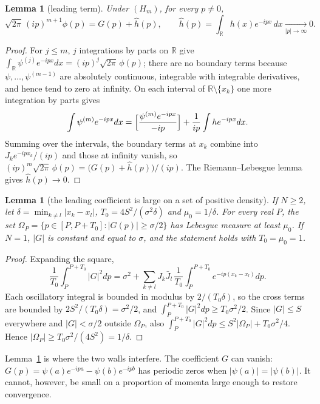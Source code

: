 \documentclass[11pt,a4paper]{article}
\newtheorem{lemma}[theorem]{Lemma}
\theoremstyle{definition}
\theoremstyle{plain}
\newcommand{\R}{\mathbb{R}}
\begin{document}
\begin{lemma}[leading term]\label{lem:A}
Under $(H_m)$, for every $p\neq0$,
\[
\sqrt{2\pi}\,(ip)^{m+1}\phi(p)=G(p)+\hat h(p),\qquad
\hat h(p)=\int_\R h(x)e^{-ipx}\,dx\xrightarrow[|p|\to\infty]{}0 .
\]
\end{lemma}

\begin{proof}
For $j\le m$, $j$ integrations by parts on $\R$ give
$\int_\R\psi^{(j)}e^{-ipx}dx=(ip)^j\sqrt{2\pi}\,\phi(p)$; there are no
boundary terms because $\psi,\dots,\psi^{(m-1)}$ are absolutely continuous,
integrable with integrable derivatives, and hence tend to zero at infinity. On
each interval of $\R\setminus\{x_k\}$ one more integration by parts gives
\[
\int\psi^{(m)}e^{-ipx}dx=\Bigl[\frac{\psi^{(m)}e^{-ipx}}{-ip}\Bigr]
+\frac{1}{ip}\int he^{-ipx}dx .
\]
Summing over the intervals, the boundary terms at $x_k$ combine into
$J_ke^{-ipx_k}/(ip)$ and those at infinity vanish, so
$(ip)^m\sqrt{2\pi}\,\phi(p)=\bigl(G(p)+\hat h(p)\bigr)/(ip)$. The
Riemann--Lebesgue lemma gives $\hat h(p)\to0$.
\end{proof}

\begin{lemma}[the leading coefficient is large on a set of positive density]\label{lem:B}
If $N\ge2$, let $\delta=\min_{k\ne l}|x_k-x_l|$, $T_0=4S^2/(\sigma^2\delta)$
and $\mu_0=1/\delta$. For every real $P$, the set
$\Omega_P=\{p\in[P,P+T_0]:|G(p)|\ge\sigma/2\}$ has Lebesgue measure at least
$\mu_0$. If $N=1$, $|G|$ is constant and equal to $\sigma$, and the statement
holds with $T_0=\mu_0=1$.
\end{lemma}

\begin{proof}
Expanding the square,
\[
\frac1{T_0}\int_P^{P+T_0}|G|^2dp=\sigma^2+\sum_{k\ne l}J_k\bar J_l\,
\frac1{T_0}\int_P^{P+T_0}e^{-ip(x_k-x_l)}dp .
\]
Each oscillatory integral is bounded in modulus by $2/(T_0\delta)$, so the
cross terms are bounded by $2S^2/(T_0\delta)=\sigma^2/2$, and
$\int_P^{P+T_0}|G|^2dp\ge T_0\sigma^2/2$. Since $|G|\le S$ everywhere and
$|G|<\sigma/2$ outside $\Omega_P$, also
$\int_P^{P+T_0}|G|^2dp\le S^2|\Omega_P|+T_0\sigma^2/4$. Hence
$|\Omega_P|\ge T_0\sigma^2/(4S^2)=1/\delta$.
\end{proof}

Lemma~\ref{lem:B} is where the two walls interfere. The coefficient $G$ can
vanish: $G(p)=\psi(a)e^{-ipa}-\psi(b)e^{-ipb}$ has periodic zeros when
$|\psi(a)|=|\psi(b)|$. It cannot, however, be small on a proportion of
momenta large enough to restore convergence.
\end{document}
